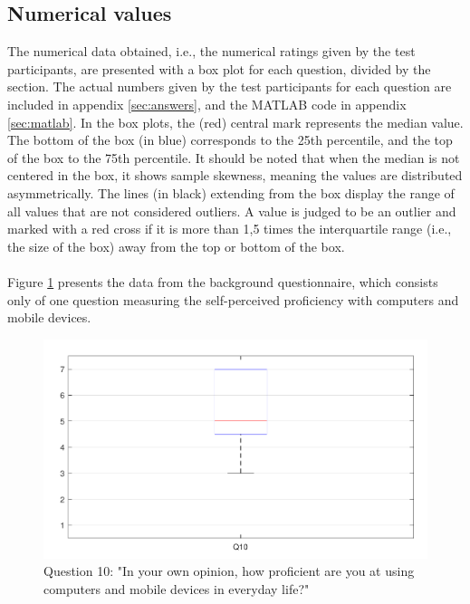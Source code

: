 \documentclass[english, 12pt, a4paper, pdftex, elec, utf8]{aaltothesis}
\begin{document}
\subsection{Numerical values}

The numerical data obtained, i.e., the numerical ratings given by the test participants, are presented with a box plot for each question, divided by the section. The actual numbers given by the test participants for each question are included in appendix \ref{sec:answers}, and the MATLAB code in appendix \ref{sec:matlab}. In the box plots, the (red) central mark represents the median value. The bottom of the box (in blue) corresponds to the 25th percentile, and the top of the box to the 75th percentile. It should be noted that when the median is not centered in the box, it shows sample skewness, meaning the values are distributed asymmetrically. The lines (in black) extending from the box display the range of all values that are not considered outliers. A value is judged to be an outlier and marked with a red cross if it is more than 1,5 times the interquartile range (i.e., the size of the box) away from the top or bottom of the box. \cite{boxplot} \\\\
Figure \ref{fig:results1} presents the data from the background questionnaire, which consists only of one question measuring the self-perceived proficiency with computers and mobile devices. 
\begin{figure}[b!]
	\centering
	\includegraphics[width=\textwidth]{T2_box1.pdf}
	\caption{Question 10: "In your own opinion, how proficient are you at using computers and mobile devices in everyday life?"}
	\label{fig:results1} 
\end{figure}
\end{document}
